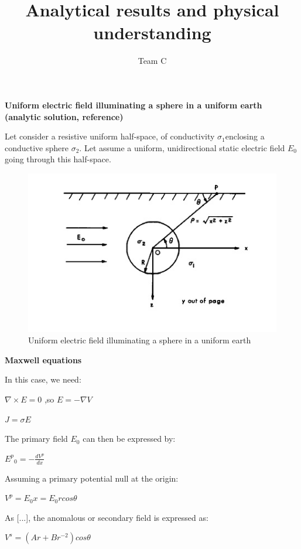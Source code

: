\documentclass[11pt,letterpaper,leqno]{amsart}
\title{Analytical results and physical understanding}
\author{Team C}
\numberwithin{equation}{section}
\begin{document}
\maketitle
\thispagestyle{empty}

\Large
\textbf{Uniform electric field illuminating a sphere in a uniform earth (analytic solution, reference)}

\normalsize
\vspace{0.4cm}

Let consider a  resistive uniform half-space, of conductivity $\sigma_1$enclosing a conductive sphere $\sigma_2$. Let assume a uniform, unidirectional static electric field $E_0$ going through this half-space.

\begin{figure}[h]
\caption{Uniform electric field illuminating a sphere in a uniform earth}
\includegraphics[scale=0.7]{electrostaticsphere.png}
\end{figure}

\vspace{0.4cm}
\textbf{Maxwell equations}
\vspace{0.4cm}


In this case, we need:

$\nabla \times E =0$ \quad,so \quad $E=-\nabla V$

$J=\sigma E$

The primary field $E_0$ can then be expressed by:

${E^p}_0=-\frac{dV^p}{dx}$

Assuming a primary potential null at the origin:

$V^p=E_0x=E_0 r cos\theta$

As [...], the anomalous or secondary field is expressed as:

$V^s=(A r + B r^{-2}) cos\theta$
\end{document}
